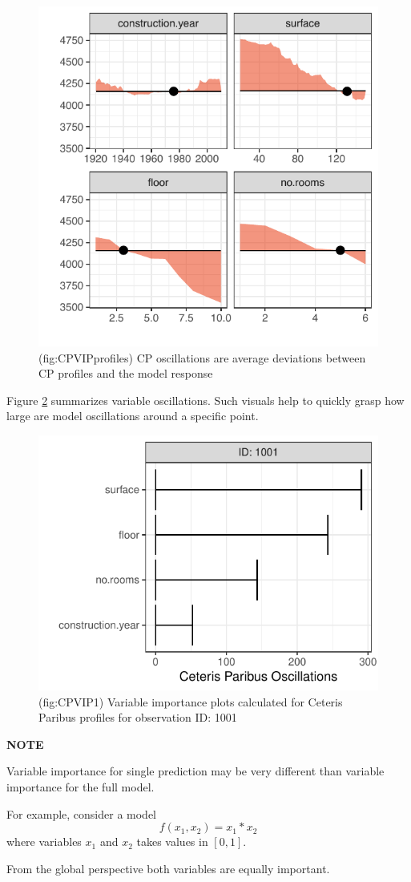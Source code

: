 \documentclass[]{krantz}
\theoremstyle{definition}
\theoremstyle{definition}
\theoremstyle{definition}
\theoremstyle{remark}
\begin{document}
\begin{figure}

{\centering \includegraphics[width=0.5\linewidth]{figure/CP_VIP_profiles} 

}

\caption{(fig:CPVIPprofiles) CP oscillations are average deviations between CP profiles and the model response}\label{fig:CPVIPprofiles}
\end{figure}

Figure \ref{fig:CPVIP1} summarizes variable oscillations. Such visuals
help to quickly grasp how large are model oscillations around a specific
point.

\begin{figure}

{\centering \includegraphics[width=0.4\linewidth]{figure/cp_vip_1} 

}

\caption{(fig:CPVIP1) Variable importance plots calculated for Ceteris Paribus profiles for observation ID: 1001}\label{fig:CPVIP1}
\end{figure}

\textbf{NOTE}

Variable importance for single prediction may be very different than
variable importance for the full model.

For example, consider a model \[
f(x_1, x_2) = x_1 * x_2
\] where variables \(x_1\) and \(x_2\) takes values in \([0,1]\).

From the global perspective both variables are equally important.
\end{document}
